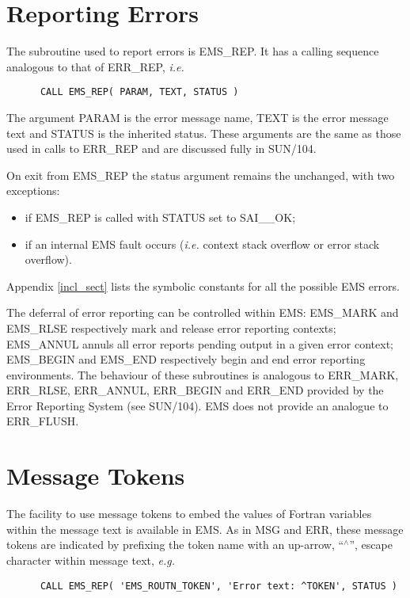 \section {Reporting Errors}

The subroutine used to report errors is EMS\_REP. 
It has a calling sequence analogous to that of ERR\_REP, {\em i.e.}

\begin{verbatim}
      CALL EMS_REP( PARAM, TEXT, STATUS )
\end{verbatim}

The argument PARAM is the error message name, TEXT is the error message text and
STATUS is the inherited status.
These arguments are the same as those used in calls to ERR\_REP and are
discussed fully in SUN/104.

On exit from EMS\_REP the status argument remains the unchanged, with two
exceptions:

\begin {itemize}
\item if EMS\_REP is called with STATUS set to SAI\_\_OK;
\item if an internal EMS fault occurs ({\em i.e.} context stack overflow or
error stack overflow).
\end {itemize}

Appendix \ref{incl_sect} lists the symbolic constants for all the possible
EMS errors.

The deferral of error reporting can be controlled within EMS: EMS\_MARK 
and EMS\_RLSE respectively mark and release error reporting contexts;
EMS\_ANNUL annuls all error reports pending output in a given error context;
EMS\_BEGIN and EMS\_END respectively begin and end error reporting
environments.
The behaviour of these subroutines is analogous to ERR\_MARK, ERR\_RLSE, 
ERR\_ANNUL, ERR\_BEGIN and ERR\_END provided by the Error Reporting System (see
SUN/104).
EMS does not provide an analogue to ERR\_FLUSH.


\section {Message Tokens}

The facility to use message tokens to embed the values of Fortran variables
within the message text is available in EMS.
As in MSG and ERR, these message tokens are  indicated by prefixing the token
name with an up-arrow, ``$^\wedge$'', escape character within message text, 
{\em e.g.}

\begin{verbatim}
      CALL EMS_REP( 'EMS_ROUTN_TOKEN', 'Error text: ^TOKEN', STATUS )
\end{verbatim}

